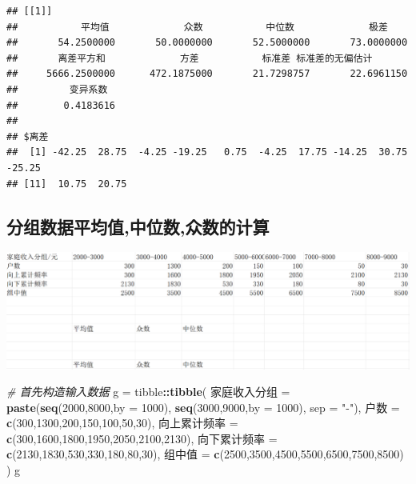 \documentclass[
]{article}
\newenvironment{Shaded}{\begin{snugshade}}{\end{snugshade}}
\newcommand{\AttributeTok}[1]{\textcolor[rgb]{0.13,0.29,0.53}{#1}}
\newcommand{\CommentTok}[1]{\textcolor[rgb]{0.56,0.35,0.01}{\textit{#1}}}
\newcommand{\DecValTok}[1]{\textcolor[rgb]{0.00,0.00,0.81}{#1}}
\newcommand{\FunctionTok}[1]{\textcolor[rgb]{0.13,0.29,0.53}{\textbf{#1}}}
\newcommand{\NormalTok}[1]{#1}
\newcommand{\OtherTok}[1]{\textcolor[rgb]{0.56,0.35,0.01}{#1}}
\newcommand{\SpecialCharTok}[1]{\textcolor[rgb]{0.81,0.36,0.00}{\textbf{#1}}}
\newcommand{\StringTok}[1]{\textcolor[rgb]{0.31,0.60,0.02}{#1}}
\begin{document}
\begin{verbatim}
## [[1]]
##           平均值             众数           中位数             极差 
##       54.2500000       50.0000000       52.5000000       73.0000000 
##       离差平方和             方差           标准差 标准差的无偏估计 
##     5666.2500000      472.1875000       21.7298757       22.6961150 
##         变异系数 
##        0.4183616 
## 
## $离差
##  [1] -42.25  28.75  -4.25 -19.25   0.75  -4.25  17.75 -14.25  30.75 -25.25
## [11]  10.75  20.75
\end{verbatim}

\subsection{分组数据平均值,中位数,众数的计算}

\includegraphics{../picture/exp1-2.png}

\begin{Shaded}
\begin{Highlighting}[]
\CommentTok{\# 首先构造输入数据}
\NormalTok{g }\OtherTok{=}\NormalTok{ tibble}\SpecialCharTok{::}\FunctionTok{tibble}\NormalTok{(}
\NormalTok{  家庭收入分组 }\OtherTok{=} \FunctionTok{paste}\NormalTok{(}\FunctionTok{seq}\NormalTok{(}\DecValTok{2000}\NormalTok{,}\DecValTok{8000}\NormalTok{,}\AttributeTok{by =} \DecValTok{1000}\NormalTok{),}
                       \FunctionTok{seq}\NormalTok{(}\DecValTok{3000}\NormalTok{,}\DecValTok{9000}\NormalTok{,}\AttributeTok{by =} \DecValTok{1000}\NormalTok{),}
                       \AttributeTok{sep =} \StringTok{"{-}"}\NormalTok{),}
\NormalTok{  户数 }\OtherTok{=} \FunctionTok{c}\NormalTok{(}\DecValTok{300}\NormalTok{,}\DecValTok{1300}\NormalTok{,}\DecValTok{200}\NormalTok{,}\DecValTok{150}\NormalTok{,}\DecValTok{100}\NormalTok{,}\DecValTok{50}\NormalTok{,}\DecValTok{30}\NormalTok{),}
\NormalTok{  向上累计频率 }\OtherTok{=} \FunctionTok{c}\NormalTok{(}\DecValTok{300}\NormalTok{,}\DecValTok{1600}\NormalTok{,}\DecValTok{1800}\NormalTok{,}\DecValTok{1950}\NormalTok{,}\DecValTok{2050}\NormalTok{,}\DecValTok{2100}\NormalTok{,}\DecValTok{2130}\NormalTok{),}
\NormalTok{  向下累计频率 }\OtherTok{=} \FunctionTok{c}\NormalTok{(}\DecValTok{2130}\NormalTok{,}\DecValTok{1830}\NormalTok{,}\DecValTok{530}\NormalTok{,}\DecValTok{330}\NormalTok{,}\DecValTok{180}\NormalTok{,}\DecValTok{80}\NormalTok{,}\DecValTok{30}\NormalTok{),}
\NormalTok{  组中值 }\OtherTok{=} \FunctionTok{c}\NormalTok{(}\DecValTok{2500}\NormalTok{,}\DecValTok{3500}\NormalTok{,}\DecValTok{4500}\NormalTok{,}\DecValTok{5500}\NormalTok{,}\DecValTok{6500}\NormalTok{,}\DecValTok{7500}\NormalTok{,}\DecValTok{8500}\NormalTok{)}
\NormalTok{)}
\NormalTok{g}
\end{Highlighting}
\end{Shaded}
\end{document}
